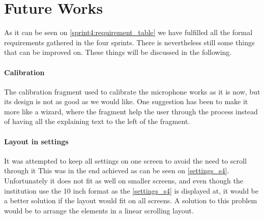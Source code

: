 \section{Future Works}
As it can be seen on \cref{sprint4:requirement_table} we have fulfilled all the formal requirements gathered in the four sprints.
There is nevertheless still some things that can be improved on. 
These things will be discussed in the following.

\paragraph{Calibration}
The calibration fragment used to calibrate the microphone works as it is now, but its design is not as good as we would like. 
One suggestion has been to make it more like a wizard, where the fragment help the user through the process instead of having all the explaining text to the left of the fragment.

\paragraph{Layout in settings}
It was attempted to keep all settings on one screen to avoid the need to scroll through it
This was in the end achieved as can be seen on \cref{settings_s4}.
Unfortunately it does not fit as well on smaller screens, and even though the institution use the 10 inch format as the \cref{settings_s4} is displayed at, it would be a better solution if the layout would fit on all screens.
A solution to this problem would be to arrange the elements in a linear scrolling layout.